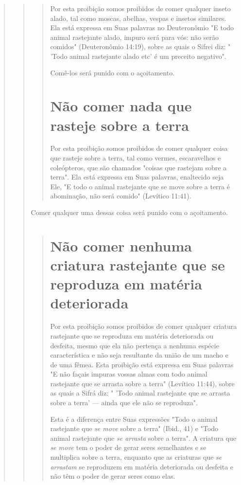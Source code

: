 \begin{quote}
\begin{quote}
\begin{quote}
Por esta proibição somos proibidos de comer qualquer inseto ala­do, tal
como moscas, abelhas, vespas e insetos similares. Ela está expressa em
Suas palavras no Deuteronômio "E todo animal rastejante alado, impuro
será para vós: não serão comidos" (Deuteronômio 14:19), sobre as quais o
Sifrei diz: " 'Todo animal rastejante alado etc' é um preceito
negativo".

Comê-los será punido com o açoitamento.

\section{Não comer nada que rasteje sobre a terra}

Por esta proibição somos proibidos de comer qualquer coisa que ras­teje
sobre a terra, tal como vermes, escaravelhos e coleópteros, que são
chama­dos "coisas que rastejam sobre a terra". Ela está expressa em Suas
palavras, enal­tecido seja Ele, "E todo o animal rastejante que se move
sobre a terra é abomi­nação, não será comido" (Levítico 11:41).
\end{quote}

Comer qualquer uma dessas coisa será punido com o açoitamento.

\begin{quote}

\section{Não comer nenhuma criatura rastejante que se reproduza em matéria deteriorada}

Por esta proibição somos proibidos de comer qualquer criatura
ras­tejante que se reproduza em matéria deteriorada ou desfeita, mesmo
que ela não pertença a nenhuma espécie característica e não seja
resultante da união de um macho e de uma fêmea. Esta proibição está
expressa em Suas palavras "E não façais impuras vossas 
almas com todo animal rastejante que se
arrasta sobre a terra" (Levítico 11:44), sobre as quais a Sifrá diz: "
'Todo animal raste­jante que se arrasta sobre a terra' --- ainda que ele
não se reproduza".

Esta é a diferença entre Suas expressões "Todo o animal rastejante que
\emph{se move} sobre a terra" (Ibid., 41) e "Todo animal rastejante que
\emph{se arrasta} sobre a terra". A criatura que \emph{se move} tem o
poder de gerar seres semelhantes e se multiplica sobre a terra, enquanto
que as criaturas que \emph{se arrastam} se re­produzem em matéria
deteriorada ou desfeita e não têm o poder de gerar seres como elas.


\end{quote}
\end{quote}
\end{quote}
